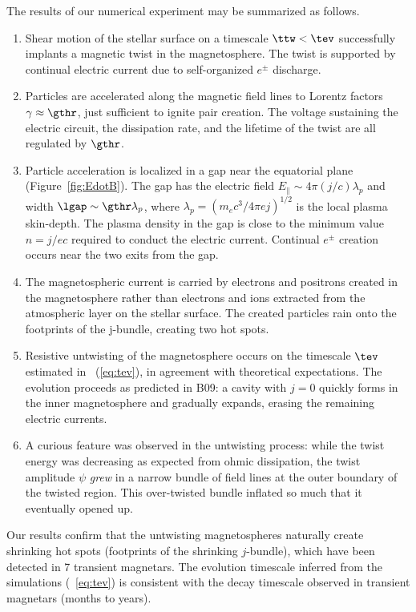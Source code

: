 The results of our numerical experiment may be summarized as follows.
\begin{enumerate}
\item Shear motion of the stellar surface on a timescale $\ttw<\tev$
successfully implants a magnetic twist in the magnetosphere.
The twist is supported by continual electric current due to
self-organized $e^\pm$ discharge.

\item Particles are accelerated along the magnetic field lines to Lorentz factors
$\gamma\approx\gthr$, just sufficient to ignite pair creation.
The voltage sustaining the electric circuit, the
dissipation rate, and the lifetime of the twist are all regulated by $\gthr$.

\item Particle acceleration is localized in a gap near the equatorial plane
(Figure~\ref{fig:EdotB}).
The gap has the electric field $E_\parallel\sim 4\pi (j/c)\lambda_p$ and width
$\lgap\sim\gthr\lambda_p$, where $\lambda_p=(m_ec^3/4\pi e j)^{1/2}$ is the local
plasma skin-depth.
The plasma density in the gap is close to the minimum value $n=j/ec$ required to
conduct the electric current. Continual $e^\pm$ creation occurs near the two exits
from the gap.

\item The magnetospheric current is carried by electrons and positrons created
in the magnetosphere rather than electrons and ions extracted from the atmospheric
layer on the stellar surface. The created particles rain onto the footprints of the j-bundle,
creating two hot spots.

\item Resistive untwisting of the magnetosphere occurs on the timescale
$\tev$
estimated in \Eq~(\ref{eq:tev}), in agreement with theoretical expectations.
The evolution proceeds as predicted in B09: a cavity with $j=0$ quickly forms in
the inner magnetosphere and gradually expands, erasing the remaining electric currents.

\item A curious feature was observed in the untwisting process: while the
twist energy was decreasing as expected from ohmic dissipation,
the twist amplitude $\psi$ {\it grew} in a narrow bundle of field lines at the outer
boundary of the twisted region. This over-twisted bundle inflated so much that it
eventually opened up.
\end{enumerate}

Our results confirm that the untwisting magnetospheres naturally create shrinking hot
spots (footprints of the shrinking $j$-bundle), which have been detected in 7 transient
magnetars. The evolution timescale inferred from the simulations (\Eq~\ref{eq:tev})
is consistent with the decay timescale observed in transient magnetars (months to years).

